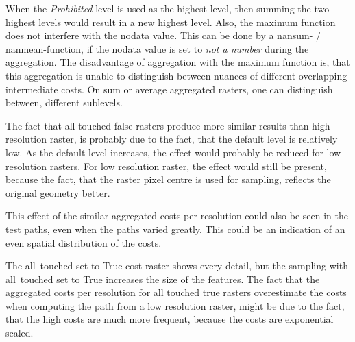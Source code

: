 When the \textit{Prohibited} level is used as the highest level, then summing the two highest levels would result in a new highest level. 
Also, the maximum function does not interfere with the nodata value. 
This can be done by a nansum- / nanmean-function, if the nodata value is set to \textit{not a number} during the aggregation.
The disadvantage of aggregation with the maximum function is, that this aggregation is unable to distinguish between nuances of different overlapping intermediate costs.
On sum or average aggregated rasters, one can distinguish between, different sublevels.

The fact that all touched false rasters produce more similar results than high resolution raster, is probably due to the fact, that the default level is relatively low.
As the default level increases, the effect would probably be reduced for low resolution rasters.
For low resolution raster, the effect would still be present, because the fact, that the raster pixel centre is used for sampling, reflects the original geometry better.

This effect of the similar aggregated costs per resolution could also be seen in the test paths, even when the paths varied greatly.
This could be an indication of an even spatial distribution of the costs.

The all~touched set to True cost raster shows every detail, but the sampling with all~touched set to True increases the size of the features.
The fact that the aggregated costs per resolution for all touched true rasters overestimate the costs when computing the path from a low resolution raster, might be due to the fact, that the high costs are much more frequent, because the costs are exponential scaled.

